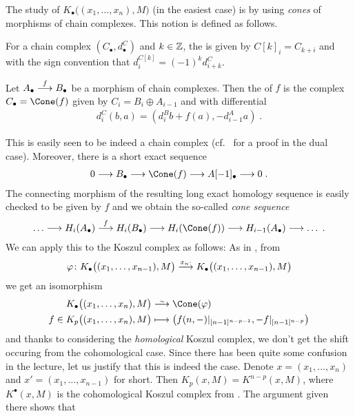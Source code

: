 \documentclass[a4paper,parskip=half,numbers=enddot, DIV=12]{scrreprt}
\begin{document}
The study of $K_\bullet\big((x_1,\ldots,x_n),M\big)$ (in the easiest case) is by using \emph{cones} of morphisms of chain complexes. This notion is defined as follows.
\begin{defi}
	\begin{alphanumerate}
		\item For a chain complex $(C_\bullet,d_\bullet^C)$ and $k\in \mathbb{Z}$, the  is given by $C[k]_i=C_{k+i}$ and with the sign convention that $d_i^{C[k]}=(-1)^kd_{i+k}^C$.
		\item Let $A_\bullet\morphism[f]B_\bullet$ be a morphism of chain complexes. Then the   of $f$ is the complex $C_\bullet=\Cone(f)$ given by $C_i=B_i\oplus A_{i-1}$ and with differential 
		\begin{align*}
			d_i^C(b,a)=(d_i^Bb+f(a), -d_{i-1}^Aa)\;.
		\end{align*}
	\end{alphanumerate}
\end{defi}
 This is easily seen to be indeed a chain complex (cf.\ \cite[Remark~2.1.1]{alggeo2} for a proof in the dual case). Moreover, there is a short exact sequence
\begin{align}\lbl{eq:ConeSeq}
	0\morphism B_\bullet\morphism \Cone(f)\morphism A[-1]_\bullet\morphism 0\;.
\end{align}
The connecting morphism of the resulting long exact homology sequence is easily checked to be given by $f$ and we obtain the so-called \emph{cone sequence}
\begin{align*}
	\ldots\morphism H_i(A_\bullet)\morphism[f] H_i(B_\bullet)\morphism H_i(\Cone(f))\morphism H_{i-1}(A_\bullet)\morphism\ldots\;.
\end{align*}
We can apply this to the Koszul complex as follows: As in \cite[Remark~2.1.3]{alggeo2}, from
\begin{align*}
	\phi\colon K_\bullet\big((x_1,\ldots,x_{n-1}),M\big)\morphism[x_n\cdot]K_\bullet\big((x_1,\ldots,x_{n-1}),M\big)
\end{align*}
we get an isomorphism
\begin{align}\lbl{eq:KoszulCone}
	\begin{split}
		K_\bullet\big((x_1,\ldots,x_n),M\big)&\isomorphism\Cone(\phi)\\
		f\in K_p\big((x_1,\ldots,x_n),M\big)&\longmapsto \left(f(n,-)|_{[n-1]^{n-p-1}}, -f|_{[n-1]^{n-p}}\right)
	\end{split}			
\end{align}
and thanks to considering the \emph{homological} Koszul complex, we don't get the shift occuring from the cohomological case. Since there has been quite some confusion in the lecture, let us justify that this is indeed the case. Denote $x=(x_1,\ldots,x_n)$ and $x'=(x_1,\ldots,x_{n-1})$ for short. Then $K_p(x,M)=K^{n-p}(x,M)$, where $K^\bullet(x,M)$ is the cohomological Koszul complex from \cite[Definition~2.1.3]{alggeo2}. The argument given there shows that
\end{document}
